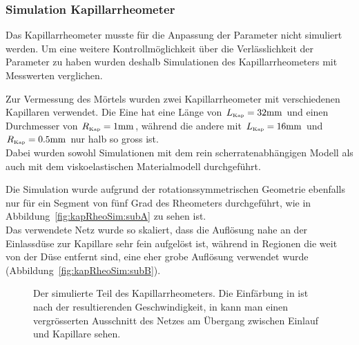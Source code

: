 \subsubsection{Simulation Kapillarrheometer}
Das Kapillarrheometer musste für die Anpassung der Parameter nicht simuliert werden. Um eine weitere Kontrollmöglichkeit über die Verlässlichkeit der Parameter zu haben wurden deshalb Simulationen des Kapillarrheometers mit Messwerten verglichen.

Zur Vermessung des Mörtels wurden zwei Kapillarrheometer mit verschiedenen Kapillaren verwendet. Die Eine hat eine Länge von $L_\text{\tiny Kap}=32\mbox{mm}$ und einen Durchmesser von $R_\text{\tiny Kap}=1\mbox{mm}$, während die andere mit $L_\text{\tiny Kap}=16\mbox{mm}$ und $R_\text{\tiny Kap}=0.5\mbox{mm}$ nur halb so gross ist.\\
Dabei wurden sowohl Simulationen mit dem rein scherratenabhängigen Modell als auch mit dem viskoelastischen Materialmodell durchgeführt.

Die Simulation wurde aufgrund der rotationssymmetrischen Geometrie ebenfalls nur für ein Segment von fünf Grad des Rheometers durchgeführt, wie in Abbildung~\ref{fig:kapRheoSim:subA} zu sehen ist.\\
Das verwendete Netz wurde so skaliert, dass die Auflösung nahe an der Einlassdüse zur Kapillare sehr fein aufgelöst ist, während in Regionen die weit von der Düse entfernt sind, eine eher grobe Auflösung verwendet wurde (Abbildung~\ref{fig:kapRheoSim:subB}).
%
\begin{figure}[tb]
    \centering
    \caption{Der simulierte Teil des Kapillarrheometers. Die Einfärbung in  ist nach der resultierenden Geschwindigkeit, in  kann man einen vergrösserten Ausschnitt des Netzes am Übergang zwischen Einlauf und Kapillare sehen.}
    \label{fig:kapRheoSim}
\end{figure}

